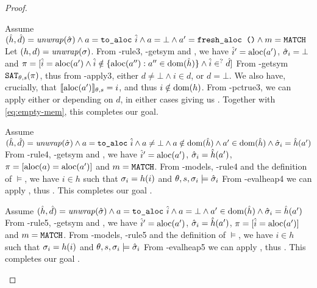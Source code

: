 \begin{proof}
\begin{hypvlist}
 Assume $(\hat{h},\hat{d})={\operatorname{\mathit{unwrap}}}(\hat{\sigma}) \land a = \texttt{to\_aloc}~\hat{i} \land a = \bot \land a'=\texttt{fresh\_aloc ()} \land m=\texttt{MATCH}$
 Let $(h,d)={\operatorname{\mathit{unwrap}}}(\sigma)$.%
 From \hyp{rule3}, \hyp{getsym} and , we have $\hat{i}'=\text{aloc}(a')$, $\hat{\sigma}_i=\bot$ and $\\{\pi=[\hat{i}=\text{aloc}(a') \land \hat{i}\notin\{\text{aloc}(a''):a''\in \operatorname{dom}(\hat{h})\} \land \hat{i} \in^? \hat{d}]}$%
 From \hyp{getsym} $\texttt{SAT}_{\mathit{\theta,s}}(\pi)$, thus from \hyp{apply3}, either $d\neq\bot\land i\in d$, or $d=\bot$. We also have, crucially, that $\llbracket\text{aloc}(a')\rrbracket_{\theta,s}=i$, and thus $i\notin \operatorname{dom}(h)$.
 From \hyp{pctrue3}, we can apply either  or  depending on $d$, in either cases giving us . Together with \ref{eq:empty-mem}, this completes our goal.
\end{hypvlist}


\begin{hypvlist}
 Assume $(\hat{h},\hat{d})={\operatorname{\mathit{unwrap}}}(\hat{\sigma}) \land a = \texttt{to\_aloc}~\hat{i} \land a \neq\bot \land a\notin \operatorname{dom}(\hat{h}) \land {a'\in\operatorname{dom}(\hat{h})} \land \hat{\sigma}_i=\hat{h}(a')$
 From \hyp{rule4}, \hyp{getsym} and , we have $\hat{i}'=\text{aloc}(a')$, $\hat{\sigma}_i=\hat{h}(a')$, ${\pi=[\text{aloc}(a)=\text{aloc}(a')]}$ and $m=\texttt{MATCH}$.
 From \hyp{models}, \hyp{rule4} and the definition of $\models$, we have $i\in h$ such that $\sigma_i=h(i)$ and ${\theta,s,\sigma_i\models\hat{\sigma}_i}$
 From \hyp{evalheap4} we can apply , thus . This completes our goal .
\end{hypvlist}


\begin{hypvlist}
 Assume $(\hat{h},\hat{d})={\operatorname{\mathit{unwrap}}}(\hat{\sigma}) \land a = \texttt{to\_aloc}~\hat{i} \land a=\bot \land a'\in\operatorname{dom}(\hat{h}) \land \hat{\sigma}_i=\hat{h}(a')$%
 From \hyp{rule5}, \hyp{getsym} and , we have $\hat{i}'=\text{aloc}(a')$, $\hat{\sigma}_i=\hat{h}(a')$, ${\pi=[\hat{i}=\text{aloc}(a')]}$ and $m=\texttt{MATCH}$.
 From \hyp{models}, \hyp{rule5} and the definition of $\models$, we have $i\in h$ such that $\sigma_i=h(i)$ and ${\theta,s,\sigma_i\models\hat{\sigma}_i}$
 From \hyp{evalheap5} we can apply , thus . This completes our goal .
\end{hypvlist}

\end{proof}



